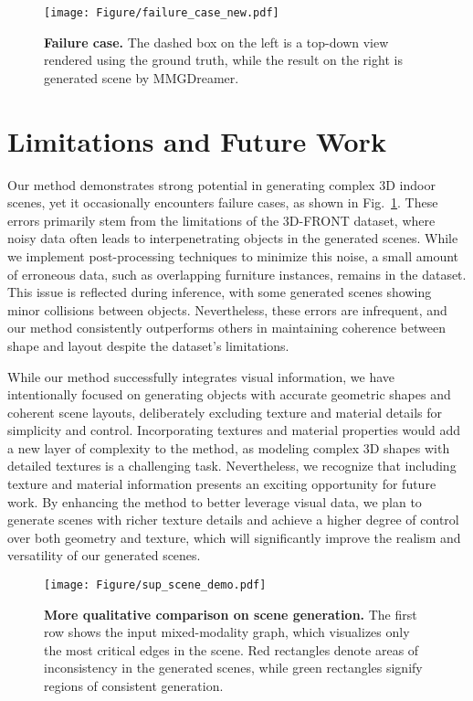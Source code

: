 \begin{figure}[t]
\centering
\texttt{[image: Figure/failure\_case\_new.pdf]} %
\caption{\textbf{Failure case.} The dashed box on the left is a top-down view rendered using the ground truth, while the result on the right is generated scene by MMGDreamer.}
\label{failure_case}
\end{figure}

\section{Limitations and Future Work}
\label{sec:Limitations and Future Work}
Our method demonstrates strong potential in generating complex 3D indoor scenes, yet it occasionally encounters failure cases, as shown in Fig.~\ref{failure_case}. These errors primarily stem from the limitations of the 3D-FRONT dataset, where noisy data often leads to interpenetrating objects in the generated scenes. While we implement post-processing techniques to minimize this noise, a small amount of erroneous data, such as overlapping furniture instances, remains in the dataset. This issue is reflected during inference, with some generated scenes showing minor collisions between objects. Nevertheless, these errors are infrequent, and our method consistently outperforms others in maintaining coherence between shape and layout despite the dataset's limitations.

While our method successfully integrates visual information, we have intentionally focused on generating objects with accurate geometric shapes and coherent scene layouts, deliberately excluding texture and material details for simplicity and control. Incorporating textures and material properties would add a new layer of complexity to the method, as modeling complex 3D shapes with detailed textures is a challenging task. Nevertheless, we recognize that including texture and material information presents an exciting opportunity for future work. By enhancing the method to better leverage visual data, we plan to generate scenes with richer texture details and achieve a higher degree of control over both geometry and texture, which will significantly improve the realism and versatility of our generated scenes.






\begin{figure*}[t]
\centering
\texttt{[image: Figure/sup\_scene\_demo.pdf]} %
\caption{\textbf{More qualitative comparison on scene generation.} The first row shows the input mixed-modality graph, which visualizes only the most critical edges in the scene. Red rectangles denote areas of inconsistency in the generated scenes, while green rectangles signify regions of consistent generation.}
\label{sup_scene_demo}
\end{figure*}

